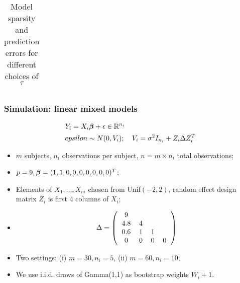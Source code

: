 \documentclass[10pt]{beamer}
\theoremstyle{definition}
\begin{document}
\begin{frame}
\begin{table}
\begin{scriptsize}
\begin{tabular}{c|cc|cc|cc}
    \end{tabular}
\caption{Model sparsity and prediction errors for different choices of $\tau$}
\end{scriptsize}
\end{table}

\end{frame}


\begin{frame}
\frametitle{Simulation: linear mixed models}

\begin{align*}
& Y_i = X_i {\boldsymbol{\beta}} + \epsilon \in {\mathbb{R}}^{n_i} \\
& epsilon \sim N (0, V_i) ; \quad V_i = \sigma^2 I_{n_i} + Z_i \Delta Z_i^T
\end{align*}

\begin{itemize}
\item $m$ subjects, $n_i$ observations per subject, $n = m \times n_i$ total observations;

\item $p = 9, {\boldsymbol{\beta}} = (1,1,0,0,0,0,0,0,0)^T$;

\item Elements of $X_1, \ldots, X_m$ chosen from Unif$(-2,2)$, random effect design matrix $Z_i$ is first 4 columns of $X_i$;

\item
%
$$ \Delta = \left(
	\begin{tabular}{cccc}
		9 & ~ & ~ & ~\\
		4.8 & 4 & ~ & ~\\
		0.6 & 1 & 1 & ~\\
		0 & 0 & 0 & 0\\
	\end{tabular}
	\right) $$
%
\item Two settings: (i) $m = 30, n_i=5$, (ii) $m = 60, n_i = 10$;

\item We use i.i.d. draws of Gamma(1,1) as bootstrap weights $W_i+1$.

\end{itemize}

\end{frame}
\end{document}
